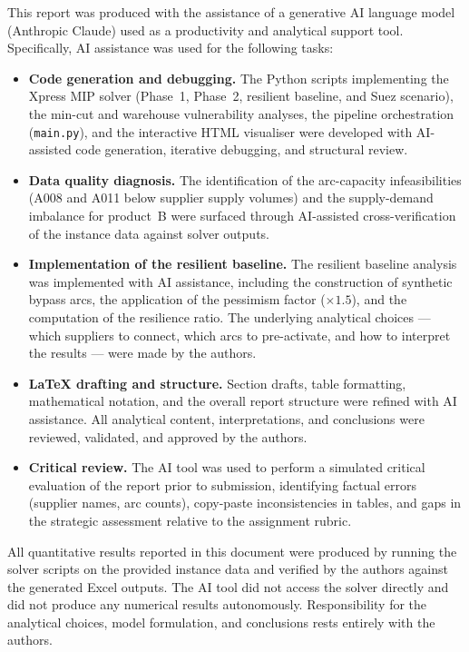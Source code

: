 


This report was produced with the assistance of a generative AI
language model (Anthropic Claude) used as a productivity and
analytical support tool. Specifically, AI assistance was used for
the following tasks:

\begin{itemize}[leftmargin=*,itemsep=3pt]

  \item \textbf{Code generation and debugging.}
  The Python scripts implementing the Xpress MIP solver
  (Phase~1, Phase~2, resilient baseline, and Suez scenario),
  the min-cut and warehouse vulnerability analyses, the
  pipeline orchestration (\texttt{main.py}), and the interactive
  HTML visualiser were developed with AI-assisted code generation,
  iterative debugging, and structural review.

  \item \textbf{Data quality diagnosis.}
  The identification of the arc-capacity infeasibilities
  (A008 and A011 below supplier supply volumes) and the
  supply-demand imbalance for product~B were surfaced through
  AI-assisted cross-verification of the instance data against
  solver outputs.

  \item \textbf{Implementation of the resilient baseline.}
  The resilient baseline analysis was implemented with AI
  assistance, including the construction of synthetic bypass
  arcs, the application of the pessimism factor ($\times 1.5$),
  and the computation of the resilience ratio. The underlying
  analytical choices --- which suppliers to connect, which arcs
  to pre-activate, and how to interpret the results --- were
  made by the authors.

  \item \textbf{LaTeX drafting and structure.}
  Section drafts, table formatting, mathematical notation,
  and the overall report structure were refined with AI
  assistance. All analytical content, interpretations, and
  conclusions were reviewed, validated, and approved by the authors.

  \item \textbf{Critical review.}
  The AI tool was used to perform a simulated critical evaluation
  of the report prior to submission, identifying factual errors
  (supplier names, arc counts), copy-paste inconsistencies in
  tables, and gaps in the strategic assessment relative to the
  assignment rubric.

\end{itemize}

All quantitative results reported in this document were produced
by running the solver scripts on the provided instance data and
verified by the authors against the generated Excel outputs.
The AI tool did not access the solver directly and did not
produce any numerical results autonomously. Responsibility for
the analytical choices, model formulation, and conclusions
rests entirely with the authors.